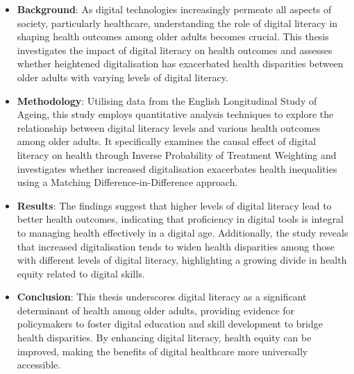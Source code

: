 \begin{itemize}
    \item \textbf{Background}: As digital technologies increasingly permeate all aspects of society, particularly healthcare, understanding the role of digital literacy in shaping health outcomes among older adults becomes crucial. This thesis investigates the impact of digital literacy on health outcomes and assesses whether heightened digitalisation has exacerbated health disparities between older adults with varying levels of digital literacy.
    \item \textbf{Methodology}: Utilising data from the English Longitudinal Study of Ageing, this study employs quantitative analysis techniques to explore the relationship between digital literacy levels and various health outcomes among older adults. It specifically examines the causal effect of digital literacy on health through Inverse Probability of Treatment Weighting and investigates whether increased digitalisation exacerbates health inequalities using a Matching Difference-in-Difference approach.
    \item \textbf{Results}: The findings suggest that higher levels of digital literacy lead to better health outcomes, indicating that proficiency in digital tools is integral to managing health effectively in a digital age. Additionally, the study reveals that increased digitalisation tends to widen health disparities among those with different levels of digital literacy, highlighting a growing divide in health equity related to digital skills.
    \item \textbf{Conclusion}: This thesis underscores digital literacy as a significant determinant of health among older adults, providing evidence for policymakers to foster digital education and skill development to bridge health disparities. By enhancing digital literacy, health equity can be improved, making the benefits of digital healthcare more universally accessible.
\end{itemize}